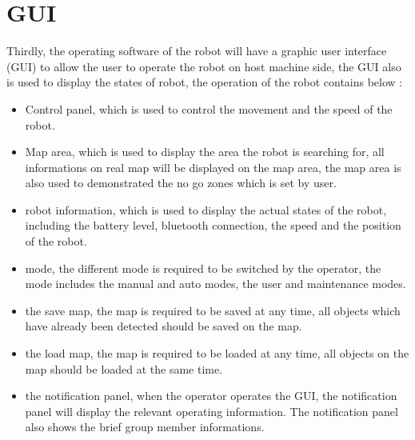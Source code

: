 \documentclass[11pt, a4paper]{report}
\begin{document}
\section{GUI}
Thirdly, the operating software of the robot will have a graphic user interface (GUI) to allow the user to operate the robot on host machine side, the GUI also is used to display the states of robot, the operation of the robot contains below :
\begin{itemize}
  \item Control panel, which is used to control the movement and the speed of the robot.
  \item Map area, which is used to display the area the robot is searching for, all informations on real map will be displayed on the map area, the map area is also used to demonstrated the no go zones which is set by user. 
  \item robot information, which is used to display the actual states of the robot, including the battery level, bluetooth connection, the speed and the position of the robot. 
  \item mode, the different mode is required to be switched by the operator, the mode includes the manual and auto modes, the user and maintenance modes.
  \item the save map, the map is required to be saved at any time, all objects which have already been detected should be saved on the map.
  \item  the load map, the map is required to be loaded at any time, all objects on the map should be loaded at the same time.
  \item the notification panel, when the operator operates the GUI, the notification panel will display the relevant operating information. The notification panel also shows the brief group member informations.   
\end{itemize}
\par\vspace{\baselineskip}
\par\vspace{\baselineskip}
\end{document}
